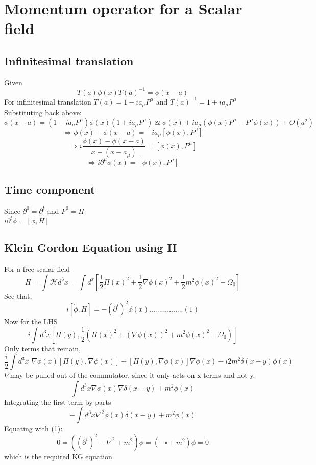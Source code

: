 \documentclass[11pt]{article}
\begin{document}
	
	\section{\color{teal} Momentum operator for a Scalar field}
	
	\subsection{Infinitesimal translation}
	Given
	\[
		T(a)\phi(x)T(a)^{-1} = \phi(x-a)
	\]
	For infinitesimal translation \(T(a) = 1 - ia_\mu P^
	\mu\) and \( T(a)^{-1} = 1 + i a_\mu P^\mu\)\\
	Substituting back above:\\
	\[
		\phi(x-a) = (1 - ia_\mu P^
		\mu)\phi(x)(1+ia_\mu P^\mu) \approxeq \phi(x) +ia_\mu(\phi(x)P^\mu - P^\mu \phi(x)) + O(a^2)
	\]
	\[
		\Rightarrow \phi(x) - \phi(x-a) = -ia_\mu[\phi(x), P^\mu]
	\]
	\[
		\Rightarrow i \frac{\phi(x)-\phi(x-a)}{x-(x-a_\mu)}  = [\phi(x),P^\mu]
	\]
	\[
		\Rightarrow \boxed{i \partial^\mu \phi(x) = [\phi(x), P^\mu]}
	\]
	
	\subsection{Time component}
	
	Since \(\partial^0 = \partial^t\) and \(P^0 = H\)\\
	\( \boxed{i\partial ^t \phi= [\phi,H]}\)
	
	\subsection{Klein Gordon Equation using H}
	
	For a free scalar field
	\[
		H = \int \mathcal{H} d^3x = \int d^x [\frac{1}{2}\Pi(x)^2 + \frac{1}{2}\nabla\phi(x)^2 + \frac{1}{2}m^2\phi(x)^2 - \Omega_0]
	\]
	See that,
	\[
		i[\dot{\phi},H] = - (\partial^t)^2 \phi(x)................. (1)	
	\]
	Now for the LHS
	\[
		i\int d^3x[\Pi(y),\frac{1}{2}(\Pi(x)^2  + (\nabla\phi(x))^2 + m^2\phi(x)^2 - \Omega_0)]
	\]
	Only terms that remain,
	\[
		\frac{i}{2} \int d^3x \, \, \nabla \phi(x)[\Pi(y),\nabla\phi(x)] + [\Pi(y),\nabla\phi(x)]\nabla \phi(x) -i 2m^2\delta(x-y)\phi(x) 
	\]
	$\nabla$may be pulled out of the commutator, since it only acts on x terms and not y.
	\[
		\int d^3x \nabla\phi(x)\nabla\delta(x-y) + m^2\phi(x)
	\]	
	Integrating the first term by parts
	\[
		-\int d^3x \nabla^2\phi(x)\delta(x-y) + m^2\phi(x)
	\]
	Equating with (1):
	\[
		0 = ((\partial^t)^2-\nabla^2 + m^2) \phi = \boxed{(-\square +m^2)\phi=0}
	\]
	which is the required KG equation.
	
\end{document}
